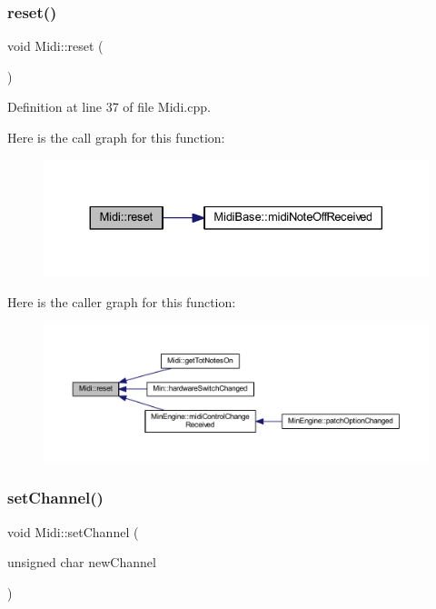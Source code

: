 \subsubsection{\texorpdfstring{reset()}{reset()}}
{\footnotesize\ttfamily void Midi\+::reset (\begin{DoxyParamCaption}{ }\end{DoxyParamCaption})}



Definition at line 37 of file Midi.\+cpp.

Here is the call graph for this function\+:
\nopagebreak
\begin{figure}[H]
\begin{center}
\leavevmode
\includegraphics[width=330pt]{da/db9/class_midi_a2b55e3e055e1076a4113374ec3c06056_cgraph}
\end{center}
\end{figure}
Here is the caller graph for this function\+:
\nopagebreak
\begin{figure}[H]
\begin{center}
\leavevmode
\includegraphics[width=350pt]{da/db9/class_midi_a2b55e3e055e1076a4113374ec3c06056_icgraph}
\end{center}
\end{figure}
\mbox{\label{class_midi_ab4278443129bc124d46a9f06723283a6}} 
\subsubsection{\texorpdfstring{set\+Channel()}{setChannel()}}
{\footnotesize\ttfamily void Midi\+::set\+Channel (\begin{DoxyParamCaption}\item[{unsigned char}]{new\+Channel }\end{DoxyParamCaption})\hspace{0.3cm}{\ttfamily [inline]}}



